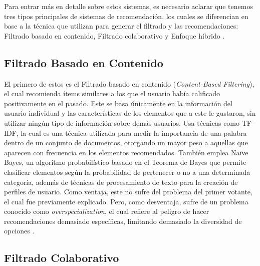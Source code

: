Para entrar más en detalle sobre estos sistemas, es necesario aclarar que tenemos tres tipos principales de sistemas de recomendación, los cuales se diferencian en base a la técnica que utilizan para generar el filtrado y las recomendaciones: Filtrado basado en contenido, Filtrado colaborativo y Enfoque híbrido \parencite{KoEtAl2022}.

\subsection{Filtrado Basado en Contenido}\label{subsec:filtrado_contenido}

El primero de estos es el Filtrado basado en contenido (\emph{Content-Based Filtering}), el cual recomienda ítems similares a los que el usuario había calificado positivamente en el pasado. Este se basa únicamente en la información del usuario individual y las características de los elementos que a este le gustaron, sin utilizar ningún tipo de información sobre demás usuarios. Usa técnicas como TF-IDF, la cual es una técnica utilizada para medir la importancia de una palabra dentro de un conjunto de documentos, otorgando un mayor peso a aquellas que aparecen con frecuencia en los elementos recomendados. También emplea Naïve Bayes, un algoritmo probabilístico basado en el Teorema de Bayes que permite clasificar elementos según la probabilidad de pertenecer o no a una determinada categoría, además de técnicas de procesamiento de texto para la creación de perfiles de usuario. Como ventaja, este no sufre del problema del primer votante, el cual fue previamente explicado. Pero, como desventaja, sufre de un problema conocido como \emph{overspecialization}, el cual refiere al peligro de hacer recomendaciones demasiado específicas, limitando demasiado la diversidad de opciones \parencite{ShahEtAl2016, KoEtAl2022}.

\subsection{Filtrado Colaborativo}\label{subsec:filtrado_colaborativo}

